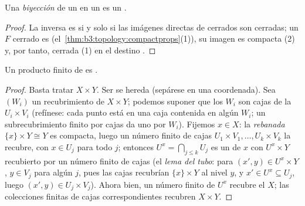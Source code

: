 \begin{corollary}\label{cor:b3:topology:compacthomeo}
Una \emph{biyección}  de un
 en un
 es un
.
\end{corollary}

\begin{proof}
La inversa es  si y solo si
las imágenes directas de cerrados son cerradas; un $F$ cerrado es
(el~\cref{thm:b3:topology:compactprops}(1)), su imagen es
compacta (2) y, por tanto, cerrada (1)
en el destino .
\end{proof}

\begin{theorem}\label{thm:b3:topology:tychonoff}
Un producto finito de  es .
\end{theorem}

\begin{proof}
Basta tratar $X \times Y$. Ser  se hereda (sepárese en una coordenada). Sea $(W_i)$ un
recubrimiento  de $X
\times Y$; podemos suponer que los $W_i$ son cajas de la
 $U_i \times
V_i$ (refínese: cada punto está en una caja contenida en algún $W_i$; un
subrecubrimiento finito por cajas da uno por $W_i$). Fijemos $x \in X$:
la \emph{rebanada} $\{x\}\times Y \cong Y$ es
compacta, luego un número finito de
cajas $U_1\times V_1, \dots, U_k\times V_k$ la recubre, con $x \in U_j$
para todo $j$; entonces $U^x = \bigcap_{j \leq k} U_j$ es un
  de $x$ con
$U^x \times Y$ recubierto por un número finito de cajas (el \emph{lema
del tubo}: para $(x', y) \in U^x \times Y$,
$y \in V_j$ para algún $j$, pues las cajas recubrían $\{x\}\times Y$ al
nivel $y$, y $x' \in U^x \subseteq U_j$, luego $(x', y) \in U_j
\times V_j$). Ahora bien, un número finito de $U^x$ recubre el
 $X$; las colecciones finitas
de cajas correspondientes recubren $X \times Y$.
\end{proof}

